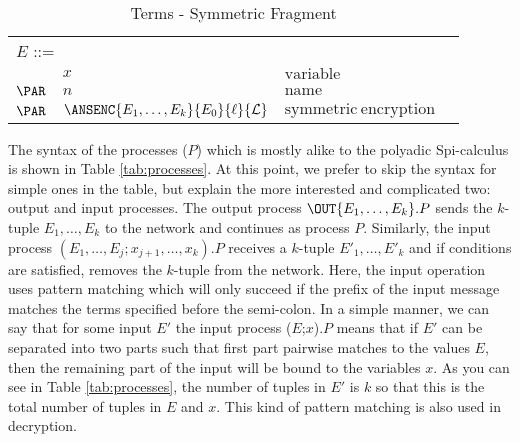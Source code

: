 \begin{table}\caption{\LYSA Terms - Symmetric Fragment}
\label{tab:terms}
\centering
\begin{tabular}{rlll}
\hline
\multicolumn{2}{l}{$E$ ::=}  \\
              & $x$                                               &  $\mathrm{variable}$ \\
$\PAR$  & $n$                                               &  $\mathrm{name}$ \\
$\PAR$  & $\ANSENC{E_1,\ldots,E_k}{E_0}{\ell}{\mathcal{L}}$  &  $\mathrm{symmetric~encryption}$ \\
\hline
\end{tabular}
\end{table}
The syntax of the processes ($P$) which is mostly alike to the polyadic Spi-calculus \cite{aba:gor} is shown in Table \ref{tab:processes}. 
At this point, we prefer to skip the syntax for simple ones in the table, but explain the more interested and complicated two: output and input processes. 
The output process $\OUT{E_1,\ldots,E_k}.P$ sends the $k$-tuple $E_1,\ldots,E_k$ to the network and continues as process $P$.
Similarly, the input process $(E_1,\ldots,E_j ; x_{j+1},\ldots,x_k).P$ receives a $k$-tuple $E'_1,\ldots,E'_k$ and if conditions are satisfied, removes the $k$-tuple from the network.
Here, the input operation uses pattern matching which will only succeed if the prefix of the input message matches the terms specified before the semi-colon. 
In a simple manner, we can say that for some input $E'$ the input process ($E$;$x$).$P$ means that 
if $E'$ can be separated into two parts such that first part pairwise matches to the values $E$, then the remaining part of the input will be bound to the variables $x$. 
As you can see in Table \ref{tab:processes}, the number of tuples in $E'$ is $k$ so that this is the total number of tuples in $E$ and $x$. 
This kind of pattern matching is also used in decryption. 

